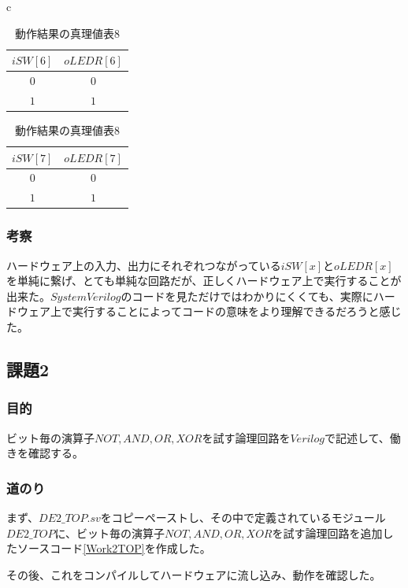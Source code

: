 \documentclass[a4paper]{jarticle}
\begin{document}
\begin{table}[H]
	\begin{center}
		\begin{tabular}{c}
			\begin{minipage}{0.5\hsize}
				\begin{center}
					\caption{動作結果の真理値表7}
					\label{Work1TruthTable7}
					\begin{tabular}{|c|c|}
						\hline
						$iSW[6]$	&$oLEDR[6]$\\	\hline\hline
						$0$		&$0$\\		\hline
						$1$		&$1$\\		\hline
					\end{tabular}
				\end{center}
			\end{minipage}
			\begin{minipage}{0.5\hsize}
				\begin{center}
					\caption{動作結果の真理値表8}
					\label{Work2TruthTable8}
					\begin{tabular}{|c|c|}
						\hline
						$iSW[7]$	&$oLEDR[7]$\\	\hline\hline
						$0$		&$0$\\		\hline
						$1$		&$1$\\		\hline
					\end{tabular}
				\end{center}
			\end{minipage}
		\end{tabular}
	\end{center}
\end{table}
\subsubsection{考察}
ハードウェア上の入力、出力にそれぞれつながっている$iSW[x]$と$oLEDR[x]$を単純に繋げ、とても単純な回路だが、正しくハードウェア上で実行することが出来た。$System Verilog$のコードを見ただけではわかりにくくても、実際にハードウェア上で実行することによってコードの意味をより理解できるだろうと感じた。
\subsection{課題2}
\subsubsection{目的}
ビット毎の演算子$NOT,AND,OR,XOR$を試す論理回路を$Verilog$で記述して、働きを確認する。
\subsubsection{道のり}
まず、$DE2\_TOP.sv$をコピーペーストし、その中で定義されているモジュール$DE2\_TOP$に、ビット毎の演算子$NOT,AND,OR,XOR$を試す論理回路を追加したソースコード\ref{Work2TOP}を作成した。

その後、これをコンパイルしてハードウェアに流し込み、動作を確認した。
\end{document}

